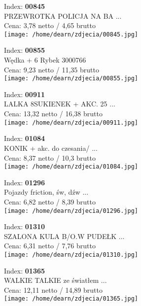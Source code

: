 {Index: \textbf{00845}\\
PRZEWROTKA  POLICJA NA BA ...\\
Cena: 3,78 netto / 4,65 brutto\\
  \texttt{[image: /home/dearn/zdjecia/00845.jpg]}}\newline\newline

{Index: \textbf{00855}\\
Wędka + 6 Rybek 3000766\\
Cena: 9,23 netto / 11,35 brutto\\
  \texttt{[image: /home/dearn/zdjecia/00855.jpg]}}\newline\newline

{Index: \textbf{00911}\\
LALKA 8SUKIENEK + AKC. 25 ...\\
Cena: 13,32 netto / 16,38 brutto\\
  \texttt{[image: /home/dearn/zdjecia/00911.jpg]}}\newline\newline

{Index: \textbf{01084}\\
KONIK + akc. do czesania/ ...\\
Cena: 8,37 netto / 10,3 brutto\\
  \texttt{[image: /home/dearn/zdjecia/01084.jpg]}}\newline\newline

{Index: \textbf{01296}\\
Pojazdy friction, św, dźw ...\\
Cena: 6,82 netto / 8,39 brutto\\
  \texttt{[image: /home/dearn/zdjecia/01296.jpg]}}\newline\newline

{Index: \textbf{01310}\\
SZALONA KULA B/O.W PUDEŁK ...\\
Cena: 6,31 netto / 7,76 brutto\\
  \texttt{[image: /home/dearn/zdjecia/01310.jpg]}}\newline\newline

{Index: \textbf{01365}\\
WALKIE TALKIE ze światłem ...\\
Cena: 12,11 netto / 14,89 brutto\\
  \texttt{[image: /home/dearn/zdjecia/01365.jpg]}}\newline\newline

